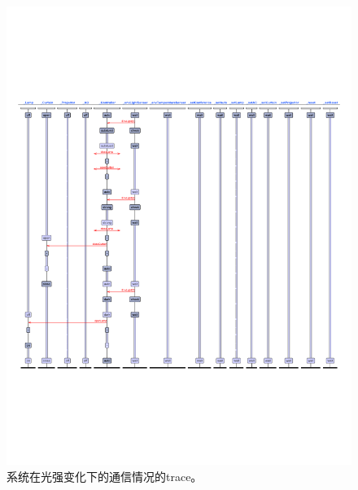 \documentclass[journal, a4paper]{IEEEtran}
\begin{document}
\begin{figure}
    \centering
    \includegraphics[width=\columnwidth]{images/run1.pdf}
    \caption{系统在光强变化下的通信情况的trace。}
    \label{figure:run1}
\end{figure}
\end{document}
